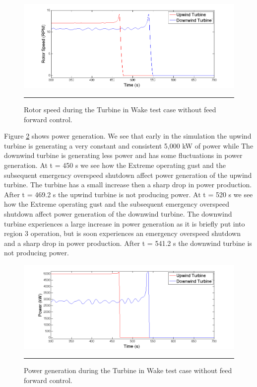 \begin{figure}[htbp] \label{fig6-28}
	\centering
		\includegraphics[trim = {1cm 0 2cm 0}, clip, width = \linewidth]{Figures/ch6Figures/fig6-28.png}
		\rule{35em}{0.5pt}
	\caption{Rotor speed during the Turbine in Wake test case without feed forward control.}
\end{figure}

Figure \ref{fig6-29} shows power generation. We see that early in the simulation the upwind turbine is generating a very constant and consistent 5,000 kW of power while The downwind turbine is generating less power and has some fluctuations in power generation. At t = 450 s we see how the Extreme operating gust and the subsequent emergency overspeed shutdown affect power generation of the upwind turbine. The turbine has a small increase then a sharp drop in power production. After t = 469.2 s the upwind turbine is not producing power. At t = 520 s we see how the Extreme operating gust and the subsequent emergency overspeed shutdown affect power generation of the downwind turbine. The downwind turbine experiences a large increase in power generation as it is briefly put into region 3 operation, but is soon experiences an emergency overspeed shutdown and a sharp drop in power production. After t = 541.2 s the downwind turbine is not producing power.

\begin{figure}[htbp] \label{fig6-29}
	\centering
		\includegraphics[trim = {1cm 0 2cm 0}, clip, width = \linewidth]{Figures/ch6Figures/fig6-29.png}
		\rule{35em}{0.5pt}
	\caption{Power generation during the Turbine in Wake test case without feed forward control.}
\end{figure}

